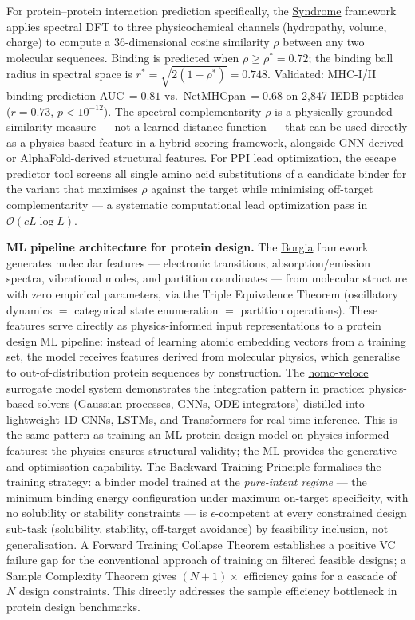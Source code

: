 \documentclass[12pt,a4paper]{article}
\begin{document}
For protein--protein interaction prediction specifically, the
\href{https://syndrome-seven.vercel.app/tools/mhc-binding}{Syndrome}
framework applies spectral DFT to three physicochemical channels
(hydropathy, volume, charge) to compute a 36-dimensional cosine similarity
$\rho$ between any two molecular sequences.
Binding is predicted when $\rho \geq \rho^* = 0.72$; the binding ball
radius in spectral space is $r^* = \sqrt{2(1-\rho^*)} = 0.748$.
Validated: MHC-I/II binding prediction AUC\,$=0.81$ vs.\ NetMHCpan\,$=0.68$
on 2,847 IEDB peptides ($r=0.73$, $p<10^{-12}$).
The spectral complementarity $\rho$ is a physically grounded similarity
measure --- not a learned distance function --- that can be used directly
as a physics-based feature in a hybrid scoring framework, alongside
GNN-derived or AlphaFold-derived structural features.
For PPI lead optimization, the escape predictor tool screens all single
amino acid substitutions of a candidate binder for the variant that maximises
$\rho$ against the target while minimising off-target complementarity ---
a systematic computational lead optimization pass in $\mathcal{O}(cL\log L)$.

\textbf{ML pipeline architecture for protein design.}
The \href{https://honjo-masamune.vercel.app/tools}{Borgia} framework
generates molecular features --- electronic transitions, absorption/emission
spectra, vibrational modes, and partition coordinates --- from molecular
structure with zero empirical parameters, via the Triple Equivalence Theorem
(oscillatory dynamics $=$ categorical state enumeration $=$ partition operations).
These features serve directly as physics-informed input representations to
a protein design ML pipeline: instead of learning atomic embedding vectors
from a training set, the model receives features derived from molecular physics,
which generalise to out-of-distribution protein sequences by construction.
The \href{https://github.com/fullscreen-triangle/homo-veloce}{homo-veloce}
surrogate model system demonstrates the integration pattern in practice:
physics-based solvers (Gaussian processes, GNNs, ODE integrators) distilled
into lightweight 1D CNNs, LSTMs, and Transformers for real-time inference.
This is the same pattern as training an ML protein design model on
physics-informed features: the physics ensures structural validity;
the ML provides the generative and optimisation capability.
The \href{https://github.com/fullscreen-triangle/purpose}{Backward Training Principle}
formalises the training strategy: a binder model trained at the
\emph{pure-intent regime} --- the minimum binding energy configuration under
maximum on-target specificity, with no solubility or stability constraints ---
is $\epsilon$-competent at every constrained design sub-task (solubility, stability,
off-target avoidance) by feasibility inclusion, not generalisation.
A Forward Training Collapse Theorem establishes a positive VC failure gap
for the conventional approach of training on filtered feasible designs;
a Sample Complexity Theorem gives $(N{+}1)\times$ efficiency gains for a
cascade of $N$ design constraints. This directly addresses the sample
efficiency bottleneck in protein design benchmarks.
\end{document}

